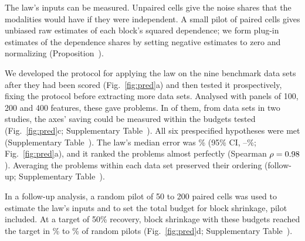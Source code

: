 \documentclass[pdflatex,sn-vancouver-num,iicol]{sn-jnl}
\begin{document}
The law's inputs can be measured. Unpaired cells give the noise shares that the modalities would have if they were independent. A small pilot of paired cells gives unbiased raw estimates of each block's squared dependence; we form plug-in estimates of the dependence shares by setting negative estimates to zero and normalizing (Proposition~).

We developed the protocol for applying the law on the nine benchmark data sets after they had been scored (Fig.~\ref{fig:pred}a) and then tested it prospectively, fixing the protocol before extracting \PredNData{} more data sets. Analysed with panels of 100, 200 and 400 features, these gave \PredNProblems{} problems. In \PredNEstimable{} of them, from \PredNEstimableData{} data sets in two studies, the axes' saving could be measured within the budgets tested (Fig.~\ref{fig:pred}c; Supplementary Table~). All six prespecified hypotheses were met (Supplementary Table~). The law's median error was \PredLawErr\% (95\% CI, \PredLawErrLo--\PredLawErrHi\%; Fig.~\ref{fig:pred}a), and it ranked the problems almost perfectly (Spearman $\rho=0.98$). Averaging the problems within each data set preserved their ordering (follow-up; Supplementary Table~).

In a follow-up analysis, a random pilot of 50 to 200 paired cells was used to estimate the law's inputs and to set the total budget for block shrinkage, pilot included. At a target of 50\% recovery, block shrinkage with these budgets reached the target in \RvPilotHalfFiftyReached\% to \RvPilotHalfTwoHundredReached\% of random pilots (Fig.~\ref{fig:pred}d; Supplementary Table~).
\end{document}
